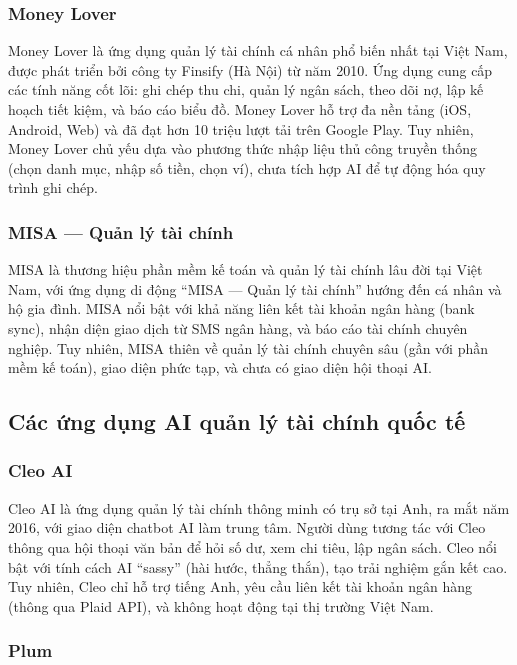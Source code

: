 \subsubsection{Money Lover}

Money Lover là ứng dụng quản lý tài chính cá nhân phổ biến nhất tại Việt Nam, được phát triển bởi công ty Finsify (Hà Nội) từ năm 2010. Ứng dụng cung cấp các tính năng cốt lõi: ghi chép thu chi, quản lý ngân sách, theo dõi nợ, lập kế hoạch tiết kiệm, và báo cáo biểu đồ. Money Lover hỗ trợ đa nền tảng (iOS, Android, Web) và đã đạt hơn 10 triệu lượt tải trên Google Play. Tuy nhiên, Money Lover chủ yếu dựa vào phương thức nhập liệu thủ công truyền thống (chọn danh mục, nhập số tiền, chọn ví), chưa tích hợp AI để tự động hóa quy trình ghi chép.

\subsubsection{MISA --- Quản lý tài chính}

MISA là thương hiệu phần mềm kế toán và quản lý tài chính lâu đời tại Việt Nam, với ứng dụng di động ``MISA --- Quản lý tài chính'' hướng đến cá nhân và hộ gia đình. MISA nổi bật với khả năng liên kết tài khoản ngân hàng (bank sync), nhận diện giao dịch từ SMS ngân hàng, và báo cáo tài chính chuyên nghiệp. Tuy nhiên, MISA thiên về quản lý tài chính chuyên sâu (gần với phần mềm kế toán), giao diện phức tạp, và chưa có giao diện hội thoại AI.

\subsection{Các ứng dụng AI quản lý tài chính quốc tế}
\label{subsec:international_apps}

\subsubsection{Cleo AI}

Cleo AI là ứng dụng quản lý tài chính thông minh có trụ sở tại Anh, ra mắt năm 2016, với giao diện chatbot AI làm trung tâm. Người dùng tương tác với Cleo thông qua hội thoại văn bản để hỏi số dư, xem chi tiêu, lập ngân sách. Cleo nổi bật với tính cách AI ``sassy'' (hài hước, thẳng thắn), tạo trải nghiệm gắn kết cao. Tuy nhiên, Cleo chỉ hỗ trợ tiếng Anh, yêu cầu liên kết tài khoản ngân hàng (thông qua Plaid API), và không hoạt động tại thị trường Việt Nam.

\subsubsection{Plum}

